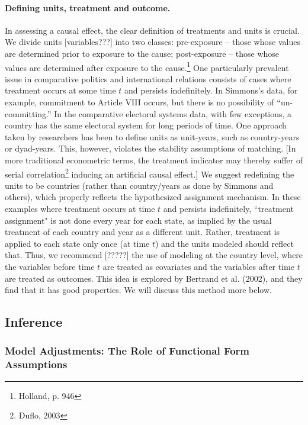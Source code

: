 \documentclass[11pt,titlepage]{article}
\begin{document}
\paragraph{Defining units, treatment and outcome.}  In assessing a
  causal effect, the clear definition of treatments and units is crucial.  
  We divide units [variables???]  into two classes: pre-exposure --
  those whose values are determined prior to exposure to the cause;
  post-exposure -- those whose values are determined after exposure to
  the cause.\footnote{Holland, p. 946}  One particularly prevalent issue
  in comparative politics and international relations consists of
  cases where treatment occurs at some time $t$ and persists
  indefinitely.  In Simmons's data, for example, commitment to Article VIII occurs,
  but there is no possibility of ``un-committing.''  In the
  comparative electoral systems data, with few exceptions, a country
  has the same electoral system for long periods of time.  One
  approach taken by researchers has been to define units as
  unit-years, such as country-years or dyad-years.  This, however, violates the
  stability assumptions of matching. 
  [In more traditional econometric terms, the treatment indicator may
  thereby suffer of serial
  correlation\footnote{Duflo, 2003} inducing an artificial causal
  effect.] We suggest redefining the units to be countries (rather than country/years as done by Simmons and others),
which properly reflects the hypothesized assignment mechanism.  In these examples where treatment occurs at time $t$
and persists indefinitely, ``treatment assignment" is not done every year for each state, as implied by the usual
treatment of each country and year as a different unit.  Rather, treatment is applied to each state only once (at time
$t$) and the units modeled should reflect that.  Thus, we recommend [?????] the use of modeling at the country level, 
where
the variables before time $t$ are treated as covariates and the variables after time $t$ are treated as outcomes.  
This idea is explored by Bertrand et al. (2002), and they find that it has good properties.  We will discuss this
method more below.


\subsection{Inference}
\subsubsection{Model Adjustments: The Role of Functional Form Assumptions}
\end{document}
